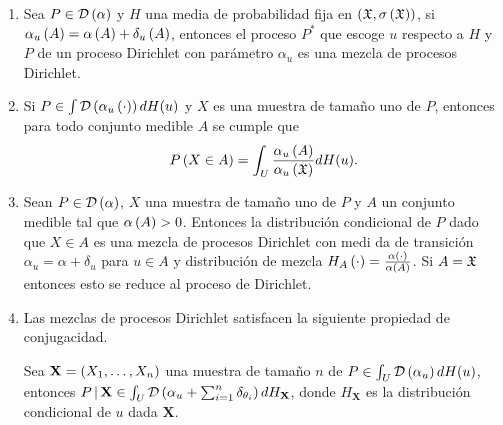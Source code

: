 \begin{enumerate}
    \item Sea $P \in \mathcal{D}\left( \alpha \right)$ y $H$ una media de probabilidad fija en $\left( \mathfrak{X}, \sigma\left( \mathfrak{X} \right) \right)$, si $\alpha_{u}\Pp{%
    A} = \alpha\Pp{A} + \delta_{u}\Pp{A}$, entonces el proceso $P^{*}$ que escoge $u$ respecto a $H$ y $P$ de un proceso %
    Dirichlet con parámetro $\alpha_{u}$ es una mezcla de procesos Dirichlet. 
    \item Si $P \in \int \mathcal{D}\left( \alpha_{u}\left( \cdot \right) \right) dH(u)$ y $X$ es una muestra de tamaño uno de $P$, entonces para %
    todo conjunto medible $A$ se cumple que
    \[
    P\left( X \in A \right) = \int_{U} \frac{\alpha_{u}\left( A \right)}{\alpha_{u}\left( \mathfrak{X} \right)} dH(u).
    \]
    \item Sean $P \in \mathcal{D}\left( \alpha \right)$, $X$ una muestra de tamaño uno de $P$ y $A$ un conjunto medible tal que $\alpha\Pp{%
    A} > 0$. Entonces la distribución condicional de $P$ dado que $X \in A$ es una mezcla de procesos Dirichlet con medi%
    da de transición $\alpha_{u} = \alpha + \delta_{u}$ para $u \in A$ y distribución de mezcla $H_{A}\Pp{\cdot} = \frac{%
    \alpha\Pp{\cdot}}{\alpha\Pp{A}}$. Si $A = \mathfrak{X}$ entonces esto se reduce al proceso de Dirichlet.
    \item Las mezclas de procesos Dirichlet satisfacen la siguiente propiedad de conjugacidad. \begin{teor}[Antoniak]
    Sea $\mathbf{X} = \left( X_{1}, \ldots, X_{n} \right)$ una muestra de tamaño $n$ de $P \in \int_{U} \mathcal{D}\left( \alpha_{u} \right) dH(u)$, entonces%
    $ P \,|\, \mathbf{X} \in \int_{U} \mathcal{D}\left( \alpha_{u} + \sum_{i = 1}^{n} \delta_{\theta_{i}} \right) dH_{\mathbf{X}}$, donde %
    $H_{\mathbf{X}}$ es la distribución condicional de $u$ dada $\mathbf{X}$. 
    \end{teor}
\end{enumerate}

